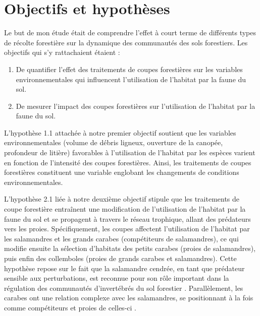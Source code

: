 \section*{Objectifs et hypothèses}
\label{sec:objectifs}

Le but de mon étude était de comprendre l’effet à court terme de différents types de récolte forestière sur la dynamique des communautés des sols forestiers. 
Les objectifs qui s’y rattachaient étaient :

\begin{enumerate}
    \item De quantifier l'effet des traitements de coupes forestières sur les variables environnementales qui influencent l'utilisation de l'habitat par la faune du sol. 
    \item De mesurer l'impact des coupes forestières sur l'utilisation de l'habitat par la faune du sol.
\end{enumerate}

L’hypothèse 1.1 attachée à notre premier objectif soutient que les variables environnementales (volume de débris ligneux, ouverture de la canopée, profondeur de litière) favorables à l’utilisation de l’habitat par les espèces varient en fonction de l’intensité des coupes forestières. 
Ainsi, les traitements de coupes forestières constituent une variable englobant les changements de conditions environnementales. 

L'hypothèse 2.1 liée à notre deuxième objectif stipule que les traitements de coupe forestière entraînent une modification de l'utilisation de l'habitat 
par la faune du sol et se propagent à travers le réseau trophique, allant des prédateurs vers les proies. 
Spécifiquement, les coupes affectent l'utilisation de l'habitat par les salamandres et les grands carabes (compétiteurs de salamandres), 
ce qui modifie ensuite la sélection d'habitats des petits carabes (proies de salamandres), puis enfin des collemboles (proies de grands carabes et salamandres). 
Cette hypothèse repose sur le fait que la salamandre cendrée, en tant que prédateur sensible aux perturbations, est reconnue pour son rôle important dans la régulation des communautés d'invertébrés du sol forestier \citep{Wyman1998Experimentalassessment,MichaelWalton2005Salamandersforestfloor,Walton2006Salamandersforestfloor,Walton2013Topdownregulation,Hickerson2017Easternredbacked}. 
Parallèlement, les carabes ont une relation complexe avec les salamandres, se positionnant à la fois comme compétiteurs et proies de celles-ci \citep{Jaeger1980MicrohabitatsTerrestrial,loveiEcologyBehaviorGround1996,Gall2003BehavioralInteractions}. 


\cleardoublepage



